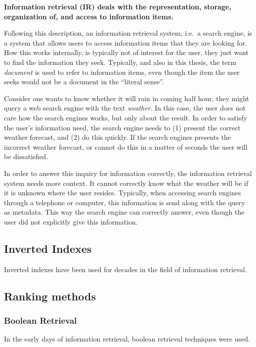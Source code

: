 \medskip
\textbf{Information retrieval (IR) deals with the representation, storage, organization of, and access to information items.}

\medskip
Following this description, an information retrieval system, i.e.\ a search engine, is a system that allows users to access information items that they are looking for. How this works internally, is typically not of interest for the user, they just want to find the information they seek. Typically, and also in this thesis, the term \emph{document} is used to refer to information items, even though the item the user seeks would not be a document in the ``literal sense''. 

Consider one wants to know whether it will rain in coming half hour, they might query a web search engine with the text \emph{weather}. In this case, the user does not care how the search engines works, but only about the result. In order to satisfy the user's information need, the search engine needs to (1) present the correct weather forecast, and (2) do this quickly. If the search engines presents the incorrect weather forecast, or cannot do this in a matter of seconds the user will be dissatisfied.

In order to answer this inquiry for information correctly, the information retrieval system needs more context. It cannot correctly know what the weather will be if it is unknown where the user resides. Typically, when accessing search engines through a telephone or computer, this information is send along with the query as metadata. This way the search engine can correctly answer, even though the user did not explicitly give this information. 


 
\subsection{Inverted Indexes}
Inverted indexes have been used for decades in the field of information retrieval. 

\subsection{Ranking methods}

\subsubsection{Boolean Retrieval}
In the early days of information retrieval, boolean retrieval techniques were used. 

